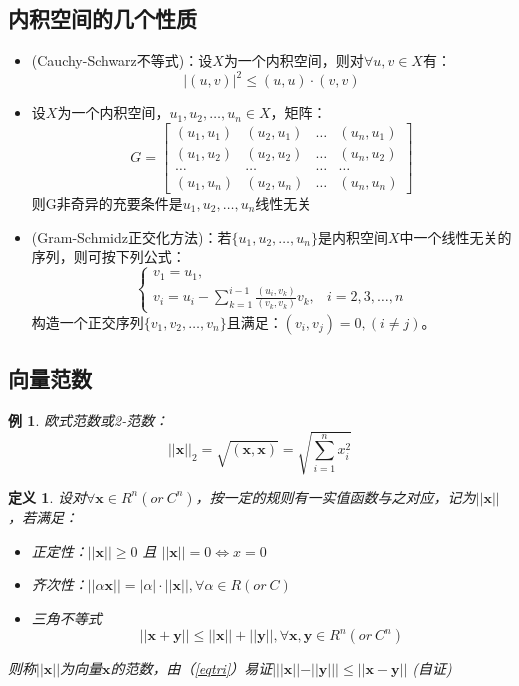 \documentclass[a4paper]{article}
\newtheorem{definition}{定义}[section]
\newtheorem{example}{例}[section]
\begin{document}
\subsection{内积空间的几个性质}
\begin{itemize}
\item (Cauchy-Schwarz不等式)：设$X$为一个内积空间，则对$\forall u,v\in X$有：
\begin{equation}
|(u,v)|^2\le (u,u)\cdot (v,v)
\end{equation}
\item 设$X$为一个内积空间，$u_1,u_2,\dots,u_n\in X$，矩阵：
$$G=\left[
 \begin{matrix}
   (u_1,u_1) & (u_2, u_1) & \dots &(u_n, u_1) \\
   (u_1,u_2) & (u_2, u_2) & \dots&(u_n,u_2) \\
   \dots & \dots & \dots & \dots \\
   (u_1, u_n) & (u_2, u_n) & \dots& (u_n, u_n)
  \end{matrix}
  \right] $$
则G非奇异的充要条件是$u_1,u_2,\dots,u_n$线性无关
\item (Gram-Schmidz正交化方法)：若$\{u_1,u_2,\dots,u_n\}$是内积空间$X$中一个线性无关的序列，则可按下列公式：
\begin{equation}
\left\{  
	\begin{array}{lr}  
	v_1 = u_1, &  \\  
	v_i = u_i - \sum^{i-1}_{k=1}\frac{(u_i,v_k)}{(v_k,v_k)}v_k, & i=2,3,\dots, n 
	\end{array}  
\right.  
\end{equation}
构造一个正交序列$\{v_1, v_2, \dots, v_n\}$且满足：$(v_i,v_j)=0,(i\neq j)$。
\end{itemize}

\subsection{向量范数}
\begin{example}
欧式范数或2-范数：\\
$$||\mathbf{x}||_2=\sqrt{(\mathbf{x},\mathbf{x})}=\sqrt{\sum^n_{i=1}x_i^2}$$
\end{example}

\begin{definition} 
设对$ \forall \mathbf{x} \in R^n(or \ C^n)$，按一定的规则有一实值函数与之对应，记为$||\mathbf{x}||$，若满足：
\begin{itemize}
\item 正定性：$||\mathbf{x}|| \ge 0$ 且 $||\mathbf{x}||=0 \Leftrightarrow x=0$
\item 齐次性：$||\alpha \mathbf{x}||=|\alpha|\cdot ||\mathbf{x}||, \forall \alpha \in R (or \ C)$
\item 三角不等式 
\begin{equation}
\label{eqtri}
||\mathbf{x}+\mathbf{y}||\le ||\mathbf{x}||+||\mathbf{y}||, \forall \mathbf{x},\mathbf{y} \in R^n(or \ C^n)
\end{equation}
\end{itemize}
则称$||\mathbf{x}||$为向量$\mathbf{x}$的范数，由（\ref{eqtri}）易证$|||\mathbf{x}||-||\mathbf{y}|||\le ||\mathbf{x}-\mathbf{y}||$ (自证)
\end{definition}
\end{document}
